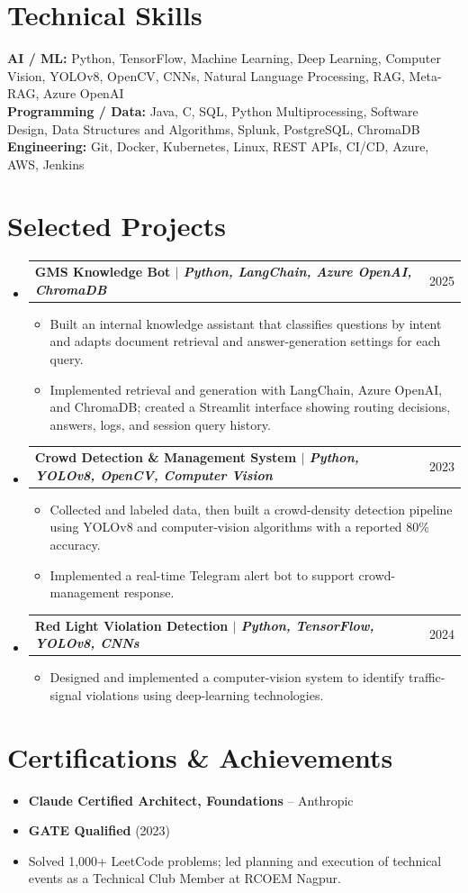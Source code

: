\documentclass[a4paper,10pt]{article}
\makeatletter
\newcommand{\resumeItem}[1]{\item \small{#1}}
\newcommand{\resumeProjectHeading}[2]{\item \begin{tabularx}{\textwidth}{@{}Xr@{}}\small\textbf{#1} & \small #2\end{tabularx}\vspace{-5pt}}
\makeatother
\begin{document}
\section{Technical Skills}
\small \textbf{AI / ML:} Python, TensorFlow, Machine Learning, Deep Learning, Computer Vision, YOLOv8, OpenCV, CNNs, Natural Language Processing, RAG, Meta-RAG, Azure OpenAI \\
\textbf{Programming / Data:} Java, C, SQL, Python Multiprocessing, Software Design, Data Structures and Algorithms, Splunk, PostgreSQL, ChromaDB \\
\textbf{Engineering:} Git, Docker, Kubernetes, Linux, REST APIs, CI/CD, Azure, AWS, Jenkins

\section{Selected Projects}
\begin{itemize}[leftmargin=0in,label={}]
  \resumeProjectHeading{GMS Knowledge Bot $|$ \emph{Python, LangChain, Azure OpenAI, ChromaDB}}{2025}
  \begin{itemize}
    \resumeItem{Built an internal knowledge assistant that classifies questions by intent and adapts document retrieval and answer-generation settings for each query.}
    \resumeItem{Implemented retrieval and generation with LangChain, Azure OpenAI, and ChromaDB; created a Streamlit interface showing routing decisions, answers, logs, and session query history.}
  \end{itemize}
  \resumeProjectHeading{Crowd Detection \& Management System $|$ \emph{Python, YOLOv8, OpenCV, Computer Vision}}{2023}
  \begin{itemize}
    \resumeItem{Collected and labeled data, then built a crowd-density detection pipeline using YOLOv8 and computer-vision algorithms with a reported 80\% accuracy.}
    \resumeItem{Implemented a real-time Telegram alert bot to support crowd-management response.}
  \end{itemize}
  \resumeProjectHeading{Red Light Violation Detection $|$ \emph{Python, TensorFlow, YOLOv8, CNNs}}{2024}
  \begin{itemize}
    \resumeItem{Designed and implemented a computer-vision system to identify traffic-signal violations using deep-learning technologies.}
  \end{itemize}
\end{itemize}

\section{Certifications \& Achievements}
\begin{itemize}[leftmargin=0.16in]
  \resumeItem{\textbf{Claude Certified Architect, Foundations} -- Anthropic}
  \resumeItem{\textbf{GATE Qualified} (2023)}
  \resumeItem{Solved 1,000+ LeetCode problems; led planning and execution of technical events as a Technical Club Member at RCOEM Nagpur.}
\end{itemize}
\end{document}
